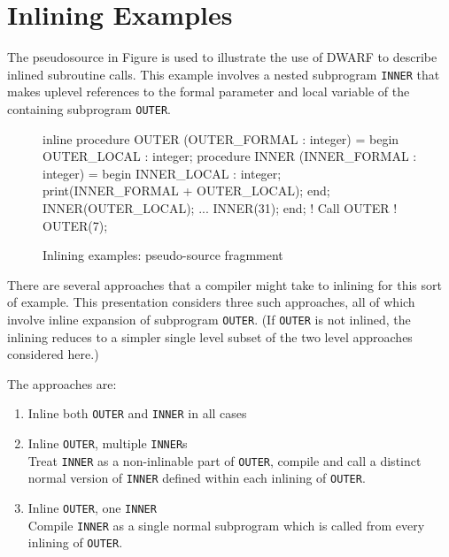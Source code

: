 \section{Inlining Examples}
\label{app:inliningexamples}
The pseudo\dash source in 
Figure 
is used to illustrate the
use of DWARF to describe inlined subroutine calls. This
example involves a nested subprogram \texttt{INNER} that makes uplevel
references to the formal parameter and local variable of the
containing subprogram \texttt{OUTER}.

\begin{figure}[ht]
\begin{nlnlisting}
inline procedure OUTER (OUTER_FORMAL : integer) =
    begin
    OUTER_LOCAL : integer;
    procedure INNER (INNER_FORMAL : integer) =
        begin
        INNER_LOCAL : integer;
        print(INNER_FORMAL + OUTER_LOCAL);
        end;
    INNER(OUTER_LOCAL);
    ...
    INNER(31);
    end;
! Call OUTER
!
OUTER(7);
\end{nlnlisting}
\caption{Inlining examples: pseudo-source fragmment} 
\label{fig:inliningexamplespseudosourcefragment}
\end{figure}


There are several approaches that a compiler might take to
inlining for this sort of example. This presentation considers
three such approaches, all of which involve inline expansion
of subprogram \texttt{OUTER}. (If \texttt{OUTER} is not inlined, the inlining
reduces to a simpler single level subset of the two level
approaches considered here.)

The approaches are:
\begin{enumerate}[1. ]
\item  Inline both \texttt{OUTER} and \texttt{INNER} in all cases

\item Inline \texttt{OUTER}, multiple \texttt{INNER}s \\
Treat \texttt{INNER} as a non-inlinable part of \texttt{OUTER}, compile and
call a distinct normal version of \texttt{INNER} defined within each
inlining of \texttt{OUTER}.

\item Inline \texttt{OUTER}, one \texttt{INNER} \\
Compile \texttt{INNER} as a single normal subprogram which is called
from every inlining of \texttt{OUTER}.
\end{enumerate}

